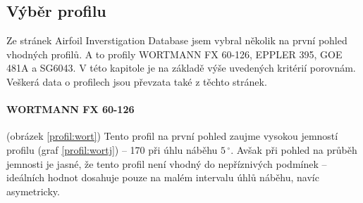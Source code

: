 \subsection{Výběr profilu}
	Ze stránek Airfoil Inverstigation Database \cite{profil} jsem vybral několik na první pohled vhodných profilů. A to profily WORTMANN FX 60-126, EPPLER 395, GOE 481A a SG6043. V této kapitole je na základě výše uvedených kritérií porovnám. Veškerá data o profilech jsou převzata také z těchto stránek.
	\paragraph{WORTMANN FX 60-126}(obrázek \ref{profil:wort}) Tento profil na první pohled zaujme vysokou jemností profilu (graf \ref{profil:wortj}) – 170 při úhlu náběhu $5\,^{\circ}$. Avšak při pohled na průběh jemnosti je jasné, že tento profil není vhodný do nepříznivých podmínek – ideálních hodnot dosahuje pouze na malém intervalu úhlů náběhu, navíc asymetricky.
